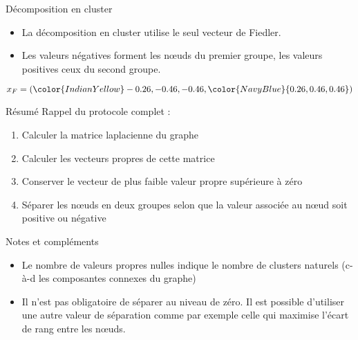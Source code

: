 \begin{frame}{Décomposition en cluster}
    \begin{minipage}{0.64\linewidth}
        \begin{itemize}
            \item La décomposition en cluster utilise le seul vecteur de Fiedler.
            \item Les valeurs négatives forment les nœuds du premier groupe, les valeurs positives ceux du second groupe.
        \end{itemize}
        $x_F = ({\color{IndianYellow}-0.26, -0.46, -0.46}, {\color{NavyBlue}{0.26, 0.46, 0.46}})$
    \end{minipage}
    \begin{minipage}{0.34\linewidth}
    \end{minipage}
\end{frame}

\begin{frame}{Résumé}
    Rappel du protocole complet :
    \begin{enumerate}
        \item Calculer la matrice laplacienne du graphe
        \item Calculer les vecteurs propres de cette matrice
        \item Conserver le vecteur de plus faible valeur propre supérieure à zéro
        \item Séparer les nœuds en deux groupes selon que la valeur associée au nœud soit positive ou négative
    \end{enumerate}
\end{frame}

\begin{frame}{Notes et compléments}
    \begin{itemize}
        \item Le nombre de valeurs propres nulles indique le nombre de clusters naturels (c-à-d les composantes connexes du graphe)
        \item Il n'est pas obligatoire de séparer au niveau de zéro. Il est possible d'utiliser une autre valeur de séparation comme par exemple celle qui maximise l'écart de rang entre les nœuds.
    \end{itemize}
\end{frame}

